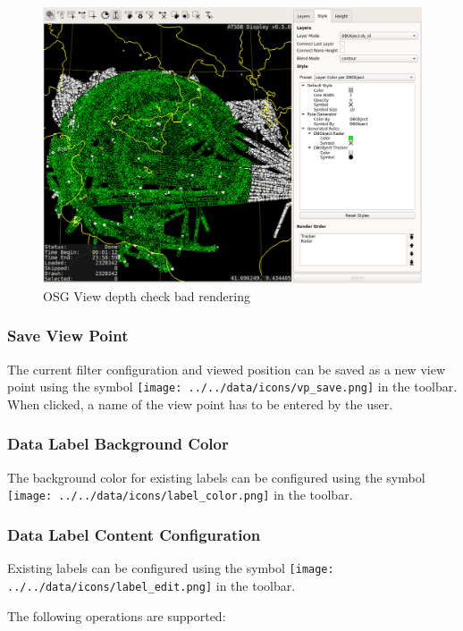 \begin{figure}[H]
    \hspace*{-2.5cm}
    \includegraphics[width=19cm,frame]{figures/osgview_depth_check_bad.png}
  \caption{OSG View depth check bad rendering}
\end{figure}

\subsubsection{Save View Point}

The current filter configuration and viewed position can be saved as a new view point using the symbol \texttt{[image: ../../data/icons/vp\_save.png]} in the toolbar. When clicked, a name of the view point has to be entered by the user. 

\subsubsection{Data Label Background Color}

The background color for existing labels can be configured using the symbol \texttt{[image: ../../data/icons/label\_color.png]} in the toolbar.

\subsubsection{Data Label Content Configuration}

Existing labels can be configured using the symbol \texttt{[image: ../../data/icons/label\_edit.png]} in the toolbar.

The following operations are supported:

